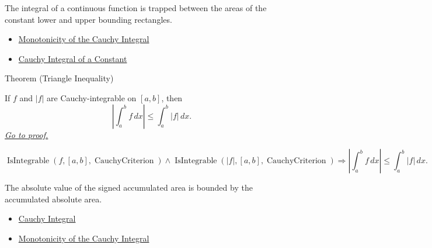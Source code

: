\begin{remark*}[Interpretation]
The integral of a continuous function is trapped between the areas of the
constant lower and upper bounding rectangles.
\end{remark*}

\begin{dependencies}
\begin{itemize}
  \item \hyperref[thm:cauchy-integral-monotonicity]{Monotonicity of the Cauchy Integral}
  \item \hyperref[prop:cauchy-integral-constant]{Cauchy Integral of a Constant}
\end{itemize}
\end{dependencies}

\begin{theorembox}{Theorem (Triangle Inequality)}
\begin{theorem}
\label{thm:cauchy-integral-triangle-inequality}
If \(f\) and \(|f|\) are Cauchy-integrable on \([a,b]\), then
\[
  \left|\int_a^b f\,dx\right|\le \int_a^b |f|\,dx .
\]
\hyperref[prf:cauchy-integral-triangle-inequality]{\textit{Go to proof.}}
\end{theorem}
\end{theorembox}

\begin{remark*}
\[
\operatorname{IsIntegrable}(f,[a,b],\operatorname{CauchyCriterion})\land
\operatorname{IsIntegrable}(|f|,[a,b],\operatorname{CauchyCriterion})
\Longrightarrow
\left|\int_a^b f\,dx\right|\le \int_a^b |f|\,dx.
\]
\end{remark*}

\begin{remark*}[Interpretation]
The absolute value of the signed accumulated area is bounded by the accumulated
absolute area.
\end{remark*}

\begin{dependencies}
\begin{itemize}
  \item \hyperref[def:cauchy-integral]{Cauchy Integral}
  \item \hyperref[thm:cauchy-integral-monotonicity]{Monotonicity of the Cauchy Integral}
\end{itemize}
\end{dependencies}

